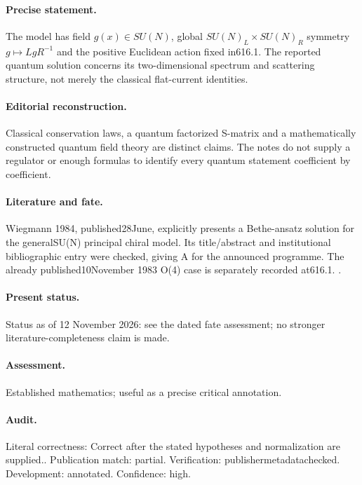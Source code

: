 \paragraph{Precise statement.} The model has field $g(x)\in SU(N)$, global $SU(N)_L\times SU(N)_R$ symmetry $g\mapsto LgR^{-1}$ and the positive Euclidean action fixed in616.1. The reported quantum solution concerns its two-dimensional spectrum and scattering structure, not merely the classical flat-current identities.

\paragraph{Editorial reconstruction.} Classical conservation laws, a quantum factorized S-matrix and a mathematically constructed quantum field theory are distinct claims. The notes do not supply a regulator or enough formulas to identify every quantum statement coefficient by coefficient.

\paragraph{Literature and fate.} Wiegmann 1984, published28June, explicitly presents a Bethe-ansatz solution for the generalSU(N) principal chiral model. Its title/abstract and institutional bibliographic entry were checked, giving A for the announced programme. The already published10November 1983 O(4) case is separately recorded at616.1. \citep{wiegmann1984sun,polyakovwiegmann1983goldstone}.

\paragraph{Present status.} Status as of 12 November 2026: see the dated fate assessment; no stronger literature-completeness claim is made.

\paragraph{Assessment.} Established mathematics; useful as a precise critical annotation.

\paragraph{Audit.} Literal correctness: Correct after the stated hypotheses and normalization are supplied.. Publication match: partial. Verification: publishermetadatachecked. Development: annotated. Confidence: high.

